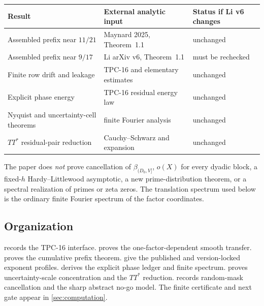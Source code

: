 \begin{center}
\small
\begin{tabular}{p{}p{}p{}}
\toprule
Result & External analytic input & Status if Li v6 changes \\
\midrule
Assembled prefix near $11/21$ & Maynard 2025, Theorem~1.1 & unchanged \\
Assembled prefix near $9/17$ & Li arXiv v6, Theorem~1.1 & must be rechecked \\
Finite row drift and leakage & TPC-16 and elementary estimates & unchanged \\
Explicit phase energy & TPC-16 residual energy law & unchanged \\
Nyquist and uncertainty-cell theorems & finite Fourier analysis & unchanged \\
$TT^*$ residual-pair reduction & Cauchy--Schwarz and expansion & unchanged \\
\bottomrule
\end{tabular}
\end{center}

The paper does \emph{not} prove cancellation of
$\beta_{(D_0,V]}$, $o(X)$ for every dyadic block, a fixed-$h$
Hardy--Littlewood asymptotic, a new prime-distribution theorem, or a
spectral realization of primes or zeta zeros.  The translation spectrum
used below is the ordinary finite Fourier spectrum of the factor
coordinates.

\subsection{Organization}

 records the TPC-16 interface.
 proves the one-factor-dependent smooth
transfer.   proves the cumulative prefix theorem.
 give the published and
version-locked exponent profiles.   derives the
explicit phase ledger and finite spectrum.
 proves uncertainty-scale concentration and the
$TT^*$ reduction.   records random-mask
cancellation and the sharp abstract no-go model.  The finite certificate
and next gate appear in \cref{sec:computation}.

